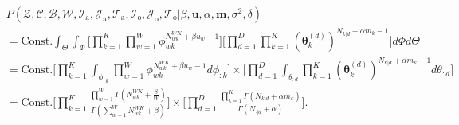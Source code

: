\documentclass[a4paper]{article}
\begin{document}
  \begin{equation}
  \begin{aligned}
  &P(\mathcal{Z}, \mathcal{C}, \mathcal{B}, \mathcal{W}, \mathcal{I}_{\mbox{a}}, \mathcal{J}_{\mbox{a}}, \mathcal{T}_{\mbox{a}}, \mathcal{I}_{\mbox{o}}, \mathcal{J}_{\mbox{o}}, \mathcal{T}_{\mbox{o}}| \beta, \boldsymbol{u}, \alpha, \boldsymbol{m}, \sigma^2,  \delta)\\&=\mbox{Const.}\int_{\Theta}\int_{\Phi}\Big[\prod_{k=1}^{K}\prod_{w=1}^{W}\phi_{wk}^{N^{WK}_{wk}+\beta u_w-1}\Big]\Big[\prod_{d=1}^{D}\prod_{k=1}^{K}(\boldsymbol{\theta}^{(d)}_{k})^{N_{k|d}+\alpha m_k-1}\Big]d\Phi d\Theta
  \\&=\mbox{Const.}\Big[\prod_{k=1}^{K}\int_{\phi_{:k}}\prod_{w=1}^{W}\phi_{wk}^{N^{WK}_{wk}+\beta u_w-1  }d\phi_{:k}\Big]\times\Big[\prod_{d=1}^{D}\int_{\theta_{:d}}\prod_{k=1}^{K}(\boldsymbol{\theta}^{(d)}_{k})^{N_{k|d}+\alpha m_k-1}d\theta_{:d}\Big]
  \\&=\mbox{Const.}\Big[\prod_{k=1}^{K}\frac{\prod_{w=1}^W\Gamma(N_{wk}^{WK}+\frac{\beta}{W})}{\Gamma(\sum_{w=1}^WN_{wk}^{WK}+\beta )}\Big]\times\Big[\prod_{d=1}^{D}\frac{\prod_{k=1}^K\Gamma(N_{k|d}+\alpha m_k)}{\Gamma(N_{\cdot|d}+\alpha)}\Big].
  \end{aligned}
  \end{equation}
\end{document}

